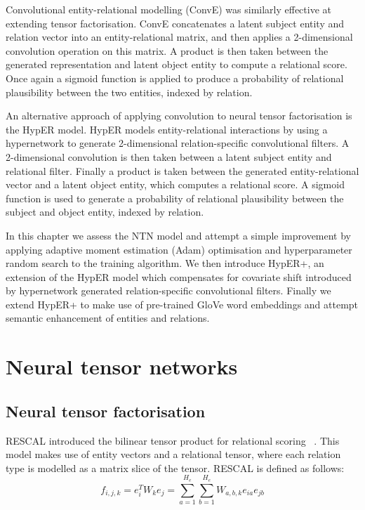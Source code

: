 \noindent Convolutional entity-relational modelling (ConvE) was similarly effective at extending tensor factorisation. ConvE concatenates a latent subject entity and relation vector into an entity-relational matrix, and then applies a 2-dimensional convolution operation on this matrix. A product is then taken between the generated representation and latent object entity to compute a relational score. Once again a sigmoid function is applied to produce a probability of relational plausibility between the two entities, indexed by relation. \par 

\noindent An alternative approach of applying convolution to neural tensor factorisation is the HypER model. HypER models entity-relational interactions by using a hypernetwork to generate 2-dimensional relation-specific convolutional filters. A 2-dimensional convolution is then taken between a latent subject entity and relational filter. Finally a product is taken between the generated entity-relational vector and a latent object entity, which computes a relational score. A sigmoid function is used to generate a probability of relational plausibility between the subject and object entity, indexed by relation. \par

\noindent In this chapter we assess the NTN model and attempt a simple improvement by applying adaptive moment estimation (Adam) optimisation and hyperparameter random search to the training algorithm. We then introduce HypER+, an extension of the HypER model which compensates for covariate shift introduced by hypernetwork generated relation-specific convolutional filters. Finally we extend HypER+ to make use of pre-trained GloVe word embeddings and attempt semantic enhancement of entities and relations. 



\section{Neural tensor networks}

\subsection{Neural tensor factorisation}
RESCAL introduced the bilinear tensor product for relational scoring \unskip ~\citep{nickel2011three}. This model makes use of entity vectors and a relational tensor, where each relation type is modelled as a matrix slice of the tensor. RESCAL is defined as follows:
\begin{equation}
	f_{i, j, k} = e_i^TW_ke_j = \sum_{a=1}^{H_e}\sum_{b=1}^{H_e}W_{a,b,k}e_{ia}e_{jb}
\end{equation}

